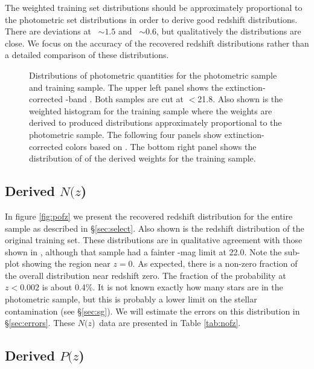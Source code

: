 \documentclass[preprint]{aastex}
\newcommand{\rmax}{21.8}
\newcommand{\pofz}{$P(z$)}
\newcommand{\nofz}{$N(z$)}
\begin{document}
The weighted training set distributions should be approximately proportional to
the photometric set distributions in order to derive good redshift
distributions.  There are deviations at \gmr\ $\sim 1.5$ and \rmi\ $\sim 0.6$,
but qualitatively the distributions are close.  We focus on the accuracy of the
recovered redshift distributions rather than a detailed comparison of these
distributions.

\begin{figure}[p] \centering

    \caption{Distributions of photometric quantities for the photometric sample
    and training sample.  The upper left panel shows the extinction-corrected
    \rmag-band \cmodelmag.  Both samples are cut at \rmag$ < $\rmax.  Also
    shown is the weighted histogram for the training sample where the weights
    are derived to produced distributions approximately proportional to the
    photometric sample.  The following four panels show extinction-corrected
    colors based on \modelmag.  The bottom right panel shows the distribution
    of of the derived weights for the training sample. } \label{fig:varhist}

    \vspace{2em}
\end{figure}

\subsection{Derived \nofz}

In figure \ref{fig:pofz} we present the recovered redshift distribution for the
entire sample as described in \S \ref{sec:select}.  Also shown is the redshift
distribution of the original training set.  These distributions are in
qualitative agreement with those shown in \citet{CunhaPhotoz09}, although that
sample had a fainter \rmag-mag limit at 22.0.  Note the sub-plot showing the
region near $z=0$.  As expected, there is a non-zero fraction of the overall
distribution near redshift zero.  The fraction of the probability at $z <
0.002$ is about 0.4\%.  It is not known exactly how many stars are in the
photometric sample, but this is probably a lower limit on the stellar
contamination (see \S \ref{sec:sg}).  We will estimate the errors on this
distribution in \S \ref{sec:errors}. These \nofz\ data are presented in Table
\ref{tab:nofz}.


\subsection{Derived \pofz}
\end{document}
